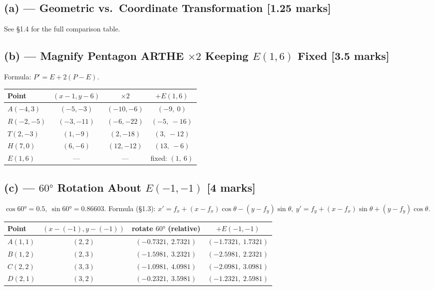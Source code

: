 \documentclass[12pt, a4paper]{article}
\newenvironment{solutionbox}{\begin{mdframed}[style=solutionframe]}{\end{mdframed}}
\begin{document}
\subsection*{(a) --- Geometric vs.\ Coordinate Transformation [1.25 marks]}
See \S1.4 for the full comparison table.

\subsection*{(b) --- Magnify Pentagon ARTHE $\times2$ Keeping $E(1,6)$ Fixed [3.5 marks]}
Formula: $P'=E+2(P-E)$.
\begin{solutionbox}
\begin{center}
\begin{tabular}{lccc}
\toprule
Point & $(x-1,y-6)$ & $\times2$ & $+E(1,6)$ \\
\midrule
$A(-4,3)$ & $(-5,-3)$ & $(-10,-6)$ & $(-9,\ 0)$ \\
$R(-2,-5)$ & $(-3,-11)$ & $(-6,-22)$ & $(-5,\ -16)$ \\
$T(2,-3)$ & $(1,-9)$ & $(2,-18)$ & $(3,\ -12)$ \\
$H(7,0)$ & $(6,-6)$ & $(12,-12)$ & $(13,\ -6)$ \\
$E(1,6)$ & --- & --- & fixed: $(1,\ 6)$ \\
\bottomrule
\end{tabular}
\end{center}
\end{solutionbox}

\subsection*{(c) --- $60°$ Rotation About $E(-1,-1)$ [4 marks]}
$\cos60°=0.5,\ \sin60°=0.86603$. Formula (\S1.3): $x'=f_x+(x-f_x)\cos\theta-(y-f_y)\sin\theta,\ y'=f_y+(x-f_x)\sin\theta+(y-f_y)\cos\theta$.
\begin{solutionbox}
\begin{center}
\begin{tabular}{lccc}
\toprule
Point & $(x-(-1),y-(-1))$ & rotate $60°$ (relative) & $+E(-1,-1)$ \\
\midrule
$A(1,1)$ & $(2,2)$ & $(-0.7321,\ 2.7321)$ & $(-1.7321,\ 1.7321)$ \\
$B(1,2)$ & $(2,3)$ & $(-1.5981,\ 3.2321)$ & $(-2.5981,\ 2.2321)$ \\
$C(2,2)$ & $(3,3)$ & $(-1.0981,\ 4.0981)$ & $(-2.0981,\ 3.0981)$ \\
$D(2,1)$ & $(3,2)$ & $(-0.2321,\ 3.5981)$ & $(-1.2321,\ 2.5981)$ \\
\bottomrule
\end{tabular}
\end{center}
\end{solutionbox}
\end{document}
